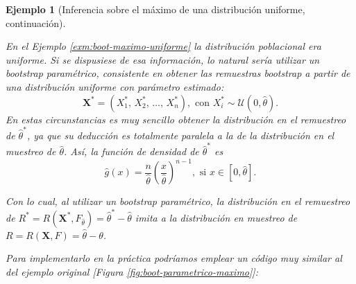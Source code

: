 \documentclass[
  10pt,
]{book}
\renewcommand{\mathbf}[1]{\symbf{#1}}
\theoremstyle{break}
\newtheorem{example}{Ejemplo}[chapter]
\theoremstyle{nonumberplain}
\begin{document}
\begin{example}[Inferencia sobre el máximo de una distribución uniforme, continuación]
\protect\hypertarget{exm:boot-maximo-parametrico}{}\label{exm:boot-maximo-parametrico}

En el Ejemplo \ref{exm:boot-maximo-uniforme} la distribución poblacional era uniforme.
Si se dispusiese de esa información, lo natural sería utilizar un bootstrap paramétrico,
consistente en obtener las remuestras bootstrap a partir de una distribución uniforme con parámetro estimado:
\[\mathbf{X}^{\ast}=\left( X_1^{\ast}\text{, }X_2^{\ast}\text{, 
}\ldots \text{, }X_n^{\ast} \right), \text{ con } X_i^{\ast} \sim \mathcal{U}\left( 0,\hat{\theta}\right).\]
En estas circunstancias es muy sencillo obtener la distribución en el
remuestreo de \(\hat{\theta}^{\ast}\), ya que su deducción es totalmente
paralela a la de la distribución en el muestreo de \(\hat{\theta}\). Así,
la función de densidad de \(\hat{\theta}^{\ast}\) es
\[\hat{g}\left( x \right) =\frac{n}{\hat{\theta}}\left( \frac{x}{\hat{\theta}}
 \right)^{n-1},\text{ si }x\in \left[ 0,\hat{\theta}\right] .\]

Con lo cual, al utilizar un bootstrap paramétrico, la distribución en el
remuestreo de \(R^{\ast}=R\left( \mathbf{X}^{\ast},F_{\hat{ \theta}} \right) =\hat{\theta}^{\ast}-\hat{\theta}\) imita a la
distribución en muestreo de
\(R=R\left( \mathbf{X},F \right) =\hat{\theta}-\theta\).

Para implementarlo en la práctica podríamos emplear un código muy similar al
del ejemplo original {[}Figura \ref{fig:boot-parametrico-maximo}{]}:


\end{example}
\end{document}
